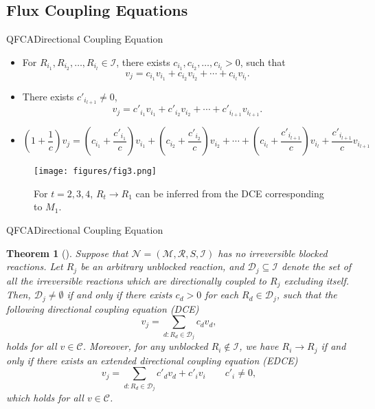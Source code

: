 \documentclass[10pt]{beamer}
\newtheorem{thm}{Theorem}[section]
\theoremstyle{remark}
\theoremstyle{definition}
\begin{document}
\subsection{Flux Coupling Equations}
\begin{frame}{QFCA}{Directional Coupling Equation}
\noindent
\begin{minipage}[t]{.49\textwidth}
\raggedright
  \begin{itemize}
    \item<2-> For $R_{i_1}, R_{i_2}, \ldots, R_{i_l}\in\mathcal{I}$, there exists 
    $c_{i_1}, c_{i_2}, \ldots, c_{i_l} > 0$, such that
	\[
	v_j = c_{i_1}v_{i_1} + c_{i_2}v_{i_2} + \cdots + c_{i_l}v_{i_l}.
	\]
    \item<3-> There exists $c'_{i_{l+1}}\neq 0$,
    \[
    v_j = c'_{i_1}v_{i_1} + c'_{i_2}v_{i_2} + \cdots + c'_{i_{l+1}}v_{i_{l+1}}.
    \]
    \item<4-> 
    \[
	(1+\frac{1}{c})v_j = (c_{i_1}+\frac{c'_{i_1}}{c})v_{i_1} + (c_{i_2}+\frac{c'_{i_2}}{c})v_{i_2} 
	+ \cdots + (c_{i_l}+\frac{c'_{i_{l+1}}}{c})v_{i_l} + \frac{c'_{i_{l+1}}}{c}v_{i_{l+1}}
	\]
  \end{itemize}
\end{minipage}
\hfill
\begin{minipage}[t]{.49\textwidth}
\raggedleft
  \begin{figure}[ht]
	\centerline{\texttt{[image: figures/fig3.png]}}
	\caption{For $t=2,3,4$, $R_t \longrightarrow R_1$ can be inferred from the DCE corresponding 
	to $M_1$.}
  \end{figure}
\end{minipage}

\end{frame}
\begin{frame}{QFCA}{Directional Coupling Equation}
\begin{thm}[\cite{Tefagh2018}]
		Suppose that $\mathcal{N} = (\mathcal{M}, \mathcal{R}, S, \mathcal{I})$ has no irreversible blocked 
		reactions. Let $R_j$ be an arbitrary unblocked reaction, and $\mathcal{D}_j\subseteq\mathcal{I}$ 
		denote the set of all the irreversible reactions which are directionally coupled to $R_j$ excluding 
		itself. Then, $\mathcal{D}_j\neq\emptyset$ if and only if there exists $c_d > 0$ for each 
		$R_d\in\mathcal{D}_j$, such that the following \emph{directional coupling equation} (DCE)
		\[
		v_j = \sum_{d:R_d\in\mathcal{D}_j}c_d v_d,
		\]
		holds for all $v\in\mathcal{C}$.
		Moreover, for any unblocked $R_i\notin\mathcal{I}$, we have $R_i \longrightarrow R_j$ 
		if and only if there exists an \emph{extended directional coupling equation} (EDCE)
		\[
		v_j = \sum_{d:R_d\in\mathcal{D}_j}c'_d v_d + c'_i v_i\qquad c'_i\neq 0,
		\]
		which holds for all $v\in\mathcal{C}$.
\end{thm}
\end{frame}
\end{document}
